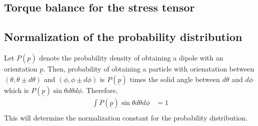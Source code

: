 \documentclass[11pt, letterpaper]{article}
\newcommand{\1}{\textbf{1}}
\newcommand{\vect}[1]{\underline{#1}} %
\begin{document}
\subsection{Torque balance for the stress tensor}
\subsection{Normalization of the probability distribution}
Let $P(\vect p)$ denote the probability density of obtaining a dipole with an orientation $\vect p$. Then, probability of obtaining a particle with orienatation between $(\theta , \theta\pm d\theta)$ and $(\phi, \phi\pm d\phi)$ is $P(\vect p)$ times the solid angle between $d\theta$ and $d\phi$ which is $P(\vect p)\sin\theta d\theta d\phi$. Therefore,
\begin{align*}
\int P(\vect p)\sin\theta d\theta d\phi &= 1\\
\end{align*}
This will determine the normalization constant for the probability distribution.
\end{document}
